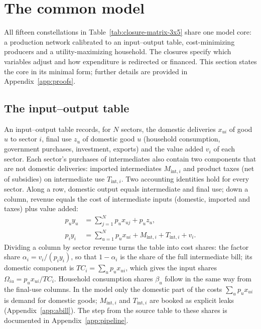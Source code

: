 \section{The common model}\label{sec:kernel}

All fifteen constellations in Table~\ref{tab:closure-matrix-3x5} share one model core: a production network calibrated to an input--output table, cost-minimizing producers and a utility-maximizing household. The closures specify which variables adjust and how expenditure is redirected or financed. This section states the core in its minimal form; further details are provided in Appendix~\ref{app:proofs}.

\renewcommand*{\theHequation}{kernel.\arabic{equation}}

\subsection{The input--output table}\label{subsec:io-table}
An input--output table records, for $N$ sectors, the domestic deliveries
$x_{ui}$ of good $u$ to sector $i$, final use $z_u$ of domestic good $u$
(household consumption, government purchases, investment, exports) and the
value added $v_i$ of each sector. Each sector's purchases of intermediates
also contain two components that are not domestic deliveries: imported
intermediates $M_{\mathrm{int},i}$ and product taxes (net of subsidies) on intermediate
use $T_{\mathrm{int},i}$. Two accounting identities hold for every sector. Along a row,
domestic output equals intermediate and final use; down a column, revenue
equals the cost of intermediate inputs (domestic, imported and taxes) plus
value added:
\begin{align}
p_u y_u &= \sum_{j=1}^N p_u x_{uj} + p_u z_u,
\label{eq:io-row}\\
p_i y_i &= \sum_{u=1}^N p_u x_{ui} + M_{\mathrm{int},i} + T_{\mathrm{int},i} + v_i.
\label{eq:io-column}
\end{align}
Dividing a column by sector revenue turns the table into cost shares: the
factor share $\alpha_i = v_i/(p_i y_i)$, so that $1-\alpha_i$ is the share of the full
intermediate bill; its domestic component is $TC_i = \sum_{u} p_{u}x_{ui}$, which gives the input shares $\Omega_{iu} = p_u x_{ui}/TC_i$. Household consumption shares $\beta_u$ follow in the same way from the final-use columns. In the model only the domestic part of the costs $\sum_u p_u x_{ui}$ is demand
for domestic goods; $M_{\mathrm{int},i}$ and $T_{\mathrm{int},i}$ are booked as explicit leaks (Appendix~\ref{app:abill}). The step from the source table to these shares is documented in Appendix~\ref{app:pipeline}.

